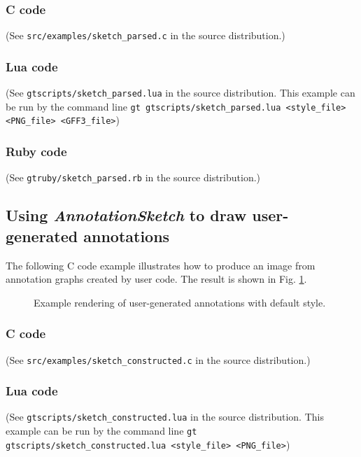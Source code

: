 \documentclass[a4paper]{scrreprt}
\begin{document}
\subsubsection{C code}
(See \texttt{src/examples/sketch\_parsed.c} in the source distribution.)

\subsubsection{Lua code}
(See \texttt{gtscripts/sketch\_parsed.lua} in the source distribution. This example can be run by the command line \texttt{gt gtscripts/sketch\_parsed.lua <style\_file> <PNG\_file> <GFF3\_file>})

\subsubsection{Ruby code}
(See \texttt{gtruby/sketch\_parsed.rb} in the source distribution.)


\subsection{Using \emph{AnnotationSketch} to draw user-generated annotations}
The following C code example illustrates how to produce an image from annotation graphs created by user code.
 The result is shown in Fig. \ref{constructed_img}.

\begin{figure}
\caption{Example rendering of user-generated annotations with default style.}
\label{constructed_img}
\end{figure}

\subsubsection{C code}
(See \texttt{src/examples/sketch\_constructed.c} in the source distribution.)

\subsubsection{Lua code}
(See \texttt{gtscripts/sketch\_constructed.lua} in the source distribution.  This example can be run by the command line \texttt{gt gtscripts/sketch\_constructed.lua <style\_file> <PNG\_file>})




%
\end{document}
